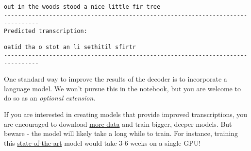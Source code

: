 \documentclass[11pt]{article}
\begin{document}
\begin{Verbatim}[commandchars=\\\{\}]
out in the woods stood a nice little fir tree
--------------------------------------------------------------------------------
Predicted transcription:

oatid tha o stot an li sethitil sfirtr
--------------------------------------------------------------------------------

    \end{Verbatim}

    One standard way to improve the results of the decoder is to incorporate
a language model. We won't pursue this in the notebook, but you are
welcome to do so as an \emph{optional extension}.

If you are interested in creating models that provide improved
transcriptions, you are encouraged to download
\href{http://www.openslr.org/12/}{more data} and train bigger, deeper
models. But beware - the model will likely take a long while to train.
For instance, training this
\href{https://arxiv.org/pdf/1512.02595v1.pdf}{state-of-the-art} model
would take 3-6 weeks on a single GPU!


    
    
    
    
\end{document}
